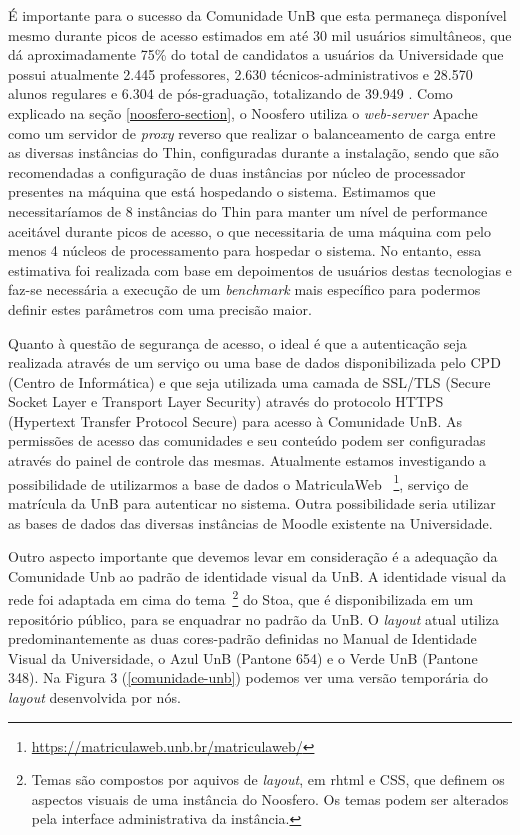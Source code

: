 É importante para o sucesso da Comunidade UnB que esta permaneça disponível
mesmo durante picos de acesso estimados em até 30 mil usuários simultâneos,
que dá aproximadamente 75\% do total de candidatos a usuários da Universidade
que possui atualmente 2.445 professores, 2.630 técnicos-administrativos
e 28.570 alunos regulares e 6.304 de pós-graduação, totalizando de 39.949
\cite{unbInstituicao}. Como explicado na seção \ref{noosfero-section}, o Noosfero
utiliza o \textit{web-server} Apache como um servidor de \textit{proxy} reverso
que realizar o balanceamento de carga entre as diversas instâncias do Thin,
configuradas durante a instalação, sendo que são recomendadas a configuração de
duas instâncias por núcleo de processador presentes na máquina que está
hospedando o sistema.
%
Estimamos que necessitaríamos de 8 instâncias do Thin
para manter um nível de performance aceitável durante picos de acesso, o que
necessitaria de uma máquina com pelo menos 4 núcleos de processamento para
hospedar o sistema. No entanto, essa estimativa foi realizada com base em
depoimentos de usuários destas tecnologias e faz-se necessária a execução de
um \textit{benchmark} mais específico para podermos definir estes parâmetros com
uma precisão maior.

Quanto à questão de segurança de acesso, o ideal é que a autenticação seja
realizada através de um serviço ou uma base de dados disponibilizada pelo CPD
(Centro de Informática) e que seja utilizada uma camada de SSL/TLS (Secure Socket
Layer e Transport Layer Security) através do protocolo HTTPS (Hypertext Transfer
Protocol Secure) para acesso à Comunidade UnB. As permissões de acesso das
comunidades e seu conteúdo podem ser configuradas através do painel de controle
das mesmas. Atualmente estamos investigando a possibilidade de utilizarmos a
base de dados o MatriculaWeb
~\footnote{\url{https://matriculaweb.unb.br/matriculaweb/}}, serviço de matrícula
da UnB para autenticar no sistema. Outra possibilidade seria utilizar as bases
de dados das diversas instâncias de Moodle existente na Universidade.
	


Outro aspecto importante que devemos levar em consideração é a adequação da
Comunidade Unb ao padrão de identidade visual da UnB.
A identidade visual da rede foi adaptada em cima do tema~\footnote{Temas são
compostos por aquivos de \textit{layout}, em rhtml e CSS, que definem os aspectos
visuais de uma instância do Noosfero. Os temas podem ser alterados pela interface
administrativa da instância.} do Stoa, que é disponibilizada em um repositório
público, para se enquadrar no padrão da UnB.
%
O \textit{layout} atual utiliza predominantemente as duas cores-padrão definidas
no Manual de Identidade Visual da Universidade\cite{visualUnB}, o Azul UnB
(Pantone 654) e o Verde UnB (Pantone 348). Na Figura 3 (\ref{comunidade-unb})
podemos ver uma versão temporária do \textit{layout} desenvolvida por nós.

